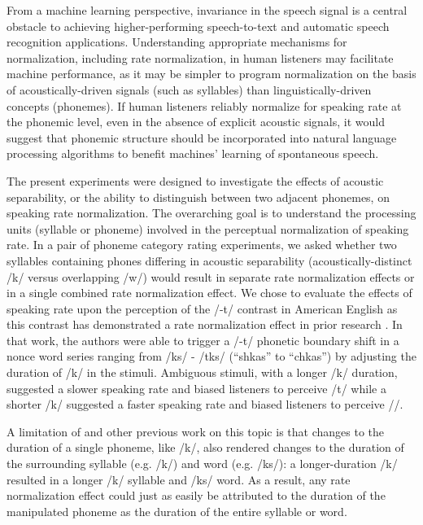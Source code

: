 From a machine learning perspective, invariance in the speech signal is a central obstacle to achieving higher-performing speech-to-text and automatic speech recognition applications. Understanding appropriate mechanisms for normalization, including rate normalization, in human listeners may facilitate machine performance, as it may be simpler to program normalization on the basis of acoustically-driven signals (such as syllables) than linguistically-driven concepts (phonemes). If human listeners reliably normalize for speaking rate at the phonemic level, even in the absence of explicit acoustic signals, it would suggest that phonemic structure should be incorporated into natural language processing algorithms to benefit machines' learning of spontaneous speech.  

The present experiments were designed to investigate the effects of acoustic separability, or the ability to distinguish between two adjacent phonemes, on speaking rate normalization. The overarching goal is to understand the processing units (syllable or phoneme) involved in the perceptual normalization of speaking rate. In a pair of phoneme category rating experiments, we asked whether two syllables containing phones differing in acoustic separability (acoustically-distinct /k\textscripta/ versus overlapping /w\textsci/) would result in separate rate normalization effects or in a single combined rate normalization effect. We chose to evaluate the effects of speaking rate upon the perception of the /\textesh -t\textesh/ contrast in American English as this contrast has demonstrated a rate normalization effect in prior research \citep{newmanPerceptualNormalizationSpeaking1996}. In that work, the authors were able to trigger a /\textesh-t\textesh/ phonetic boundary shift in a nonce word series ranging from /\textesh k\textscripta s/ - /t\textesh k\textscripta s/ (``shkas'' to ``chkas'') by adjusting the duration of /k/ in the stimuli. Ambiguous stimuli, with a longer /k/ duration, suggested a slower speaking rate and biased listeners to perceive /t\textesh/ while a shorter /k/ suggested a faster speaking rate and biased listeners to perceive /\textesh/. 

A limitation of \citet{newmanPerceptualNormalizationSpeaking1996} and other previous work on this topic is that changes to the duration of a single phoneme, like /k/, also rendered changes to the duration of the surrounding syllable (e.g. /k\textscripta/) and word (e.g. /\textesh k\textscripta s/): a longer-duration /k/ resulted in a longer /k\textscripta/ syllable and /\textesh k\textscripta s/ word. As a result, any rate normalization effect could just as easily be attributed to the duration of the manipulated phoneme as the duration of the entire syllable or word.

